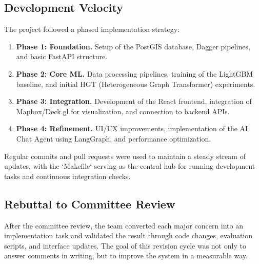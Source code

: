 \subsection{Development Velocity}
The project followed a phased implementation strategy:
\begin{enumerate}
    \item \textbf{Phase 1: Foundation.} Setup of the PostGIS database, Dagger pipelines, and basic FastAPI structure.
    \item \textbf{Phase 2: Core ML.} Data processing pipelines, training of the LightGBM baseline, and initial HGT (Heterogeneous Graph Transformer) experiments.
    \item \textbf{Phase 3: Integration.} Development of the React frontend, integration of Mapbox/Deck.gl for visualization, and connection to backend APIs.
    \item \textbf{Phase 4: Refinement.} UI/UX improvements, implementation of the AI Chat Agent using LangGraph, and performance optimization.
\end{enumerate}

Regular commits and pull requests were used to maintain a steady stream of updates, with the `Makefile` serving as the central hub for running development tasks and continuous integration checks.

\subsection{Rebuttal to Committee Review}

After the committee review, the team converted each major concern into an implementation task and validated the result through code changes, evaluation scripts, and interface updates. The goal of this revision cycle was not only to answer comments in writing, but to improve the system in a measurable way.


